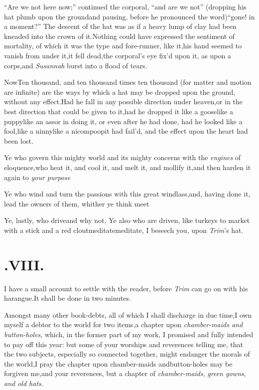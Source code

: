 \documentclass{article}
\begin{document}
\enlargethispage\baselineskip
\tsh  “Are we not here now;”\tsk\break
continued the corporal, “and are we not”\break
\tsk (dropping his hat plumb upon the ground\tsk and
pausing, before he pronounced the word)\tsk “gone! in a
moment?” The descent of the hat was as if a heavy lump of
clay had been kneaded into the crown of it.\tsh Nothing
could have expressed the sentiment of mortality, of which it
was the type and fore-runner, like it,\tsk his hand seemed
to vanish from under it,\tsk it fell dead,\tsk the
corporal’s eye fix’d upon it, as upon a corps,\tsk and
\textit{Susannah} burst into a flood of tears.

\vskip-3pt

Now\tsk Ten thousand, and ten thousand times ten thousand
(for matter and motion are infinite) are the ways by\break
which a hat may be dropped upon the ground, without any
effect.\tsk Had he 
fall in any
possible direction under hea\-ven,\tsk or in the best
direction that could be given to it,\tsk had he dropped it
like a goose\tsk like a puppy\tsk like an ass\tsk or in
doing it, or even after he had done, had he looked like a
fool,\tsk like a ninny\tsk like a nicompoop\tsk it had
fail’d, and the effect upon the heart had been lost.

\vskip-3pt

Ye who govern this mighty world and its mighty concerns with the
\textit{engines} of eloquence,\tsk who heat it, and cool it, and melt it,
and mollify it,\tsh and then harden it again to \textit{your
purpose}\tsh{}

Ye who wind and turn the passions with this great
windlass,\tsk and, having done it, lead the owners of them,
whither ye think meet\tsk

Ye, lastly, who drive\tsk\tsk and why not, Ye also who are
driven, like turkeys to market with a stick and a red
clout\tsk meditate\tsk meditate, I beseech you, upon
\textit{Trim}’s hat.

\section{.\enspace  VIII.}

\tsh I have a small account to
settle with the reader, before \textit{Trim} can go on with his
harangue.\tsk It shall be done in two minutes.

Amongst many other book-debts, all of which I shall discharge in
due time,\tsk I own myself a debtor to the world for two
items,\tsk a chapter upon \textit{chamber-maids and button-holes},
which, in the former part of my work, I promised and fully intended
to pay off this year: but some of your worships and reverences
telling me, that the two subjects, especially so connected
together, might endanger the morals of the world,\tsk I pray the
chapter upon chamber-maids and\break button-holes may be forgiven
me,\tsk and 
your reverences, but a chapter of \textit{cham\-ber-maids}, 
\textit{green gowns}, \textit{and old hats}.
\end{document}
